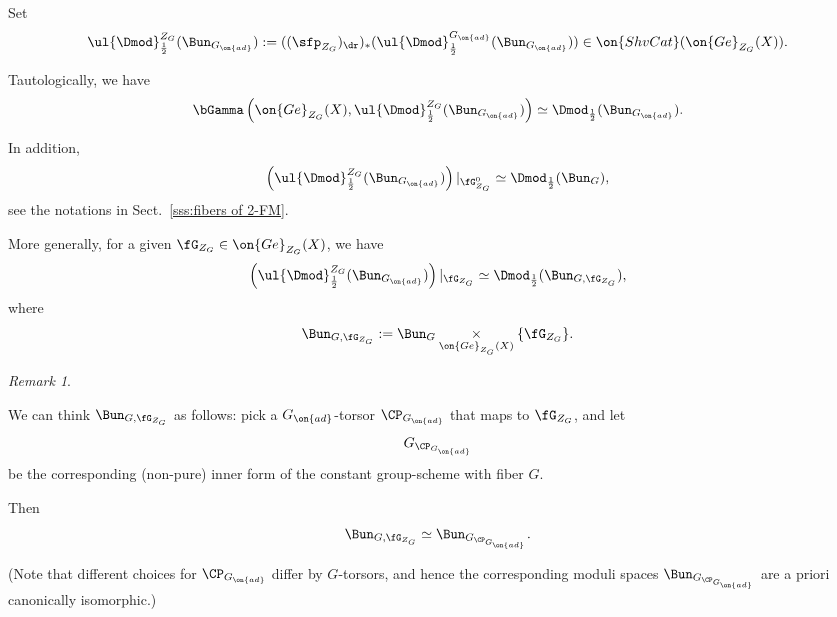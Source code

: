 \documentclass[9pt]{amsart}
\theoremstyle{remark}
\newtheorem{rem}[subsubsection]{Remark}
\theoremstyle{definition}
\theoremstyle{remark}
\newcommand{\secref}[1]{Sect.~\ref{#1}}
\numberwithin{equation}{section}
\begin{document}
\medskip

Set
$$\ul{\Dmod}^{Z_G}_{\frac{1}{2}}(\Bun_{G_{\on{ad}}}):=((\sfp_{Z_G})_\dr)_*(\ul{\Dmod}^{G_{\on{ad}}}_{\frac{1}{2}}(\Bun_{G_{\on{ad}}}))\in \on{ShvCat}(\on{Ge}_{Z_G}(X)).$$

\sssec{}

Tautologically, we have
\begin{equation} \label{e:glob sect BunG sheaf}
\bGamma\left(\on{Ge}_{Z_G}(X),\ul{\Dmod}^{Z_G}_{\frac{1}{2}}(\Bun_{G_{\on{ad}}})\right)\simeq
\Dmod_{\frac{1}{2}}(\Bun_{G_{\on{ad}}}).
\end{equation} 

In addition, 
\begin{equation} \label{e:fiber BunG sheaf}
\left(\ul{\Dmod}^{Z_G}_{\frac{1}{2}}(\Bun_{G_{\on{ad}}})\right)|_{\fG^0_{Z_G}}\simeq \Dmod_{\frac{1}{2}}(\Bun_G),
\end{equation} 
see the notations in \secref{sss:fibers of 2-FM}. 

%
%
%
%

\medskip

More generally, for a given $\fG_{Z_G}\in \on{Ge}_{Z_G}(X)$, we have
\begin{equation} \label{e:fiber BunG sheaf twisted}
\left(\ul{\Dmod}^{Z_G}_{\frac{1}{2}}(\Bun_{G_{\on{ad}}})\right)|_{\fG_{Z_G}}\simeq \Dmod_{\frac{1}{2}}(\Bun_{G,\fG_{Z_G}}),
\end{equation} 
where 
$$\Bun_{G,\fG_{Z_G}}:=\Bun_G\underset{\on{Ge}_{Z_G}(X)}\times \{\fG_{Z_G}\}.$$

\begin{rem} \label{r:twisted groups}

We can think $\Bun_{G,\fG_{Z_G}}$ as follows: pick a $G_{\on{ad}}$-torsor $\CP_{G_{\on{ad}}}$ that maps to
$\fG_{Z_G}$, and let 
$$G_{\CP_{G_{\on{ad}}}}$$
be the corresponding (non-pure) inner form of the constant group-scheme with fiber $G$.

\medskip

Then
$$\Bun_{G,\fG_{Z_G}}\simeq \Bun_{G_{\CP_{G_{\on{ad}}}}}.$$

(Note that different choices for $\CP_{G_{\on{ad}}}$ differ by $G$-torsors, and hence the corresponding moduli spaces
$\Bun_{G_{\CP_{G_{\on{ad}}}}}$ are a priori canonically isomorphic.) 

\end{rem}
\end{document}
